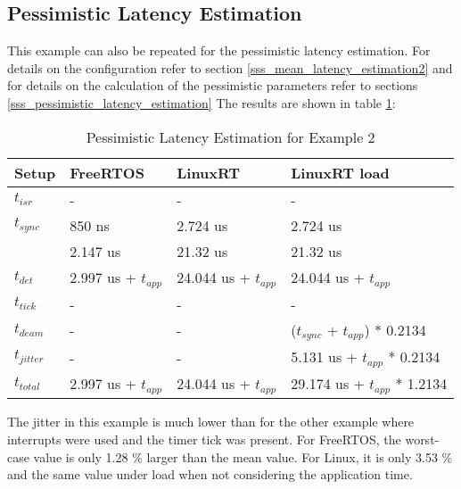 \subsection{Pessimistic Latency Estimation}\label{sss_pessimistic_latency_estimation2}
This example can also be repeated for the pessimistic latency estimation.
For details on the configuration refer to section \ref{sss_mean_latency_estimation2} and for details on the calculation of the pessimistic parameters refer to sections \ref{sss_pessimistic_latency_estimation}
The results are shown in table \ref{tab_example2_pessimistic}:
\begin{table}[htbp]
	\centering
		\begin{tabular}{|l|l|l|l|}
			\hline
				Setup					& FreeRTOS 								& LinuxRT 							& LinuxRT load  \\
				\hline 
			 	$t_{isr}$ 		& -				 								& -											& -							\\
			  $t_{sync}$		& 850 ns			  	  			& 2.724 us 				 			& 2.724 us			\\
			  							&	2.147 us								& 21.32 us							& 21.32 us			\\
			  \hline 
			  $t_{det}$			& 2.997 us + $t_{app}$		& 24.044 us + $t_{app}$	& 24.044 us	+ $t_{app}$		\\ 
			  \hline
			  \hline
			  $t_{tick}$		& -												& -					 					  & -													\\
			  $t_{deam}$		& -				  							& - 				 						& ($t_{sync}$ + $t_{app}$) * 0.2134 \\ 
				\hline 
			  $t_{jitter}$	& -				  							& -										  & 5.131 us	+ $t_{app}$ * 0.2134 \\ 
			  \hline
			  \hline 
			  $t_{total}$		& 2.997 us + $t_{app}$	 & 24.044 us + $t_{app}$  &	29.174 us + $t_{app}$ * 1.2134 	\\ 
			\hline
		\end{tabular}
	\caption{Pessimistic Latency Estimation for Example 2}
	\label{tab_example2_pessimistic}
\end{table}
The jitter in this example is much lower than for the other example where interrupts were used and the timer tick was present.
For FreeRTOS, the worst-case value is only 1.28 \% larger than the mean value.
For Linux, it is only 3.53 \% and the same value under load when not considering the application time. 

